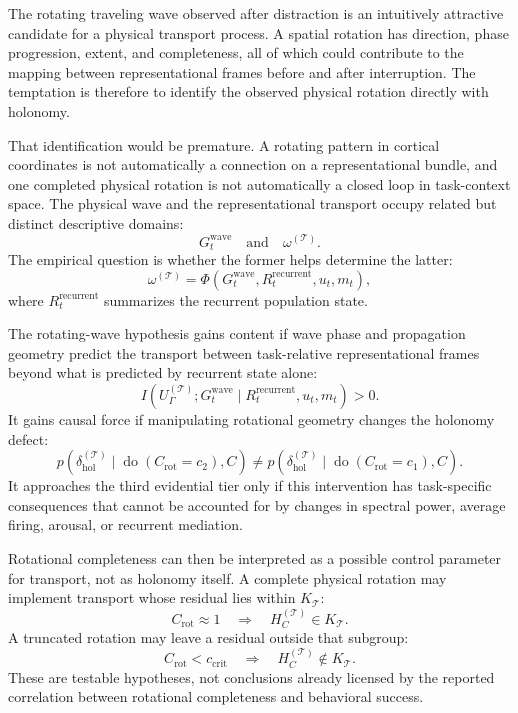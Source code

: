 \documentclass[11pt]{book}
\begin{document}
The rotating traveling wave observed after distraction is an intuitively attractive candidate for a physical transport process. A spatial rotation has direction, phase progression, extent, and completeness, all of which could contribute to the mapping between representational frames before and after interruption. The temptation is therefore to identify the observed physical rotation directly with holonomy.

That identification would be premature. A rotating pattern in cortical coordinates is not automatically a connection on a representational bundle, and one completed physical rotation is not automatically a closed loop in task-context space. The physical wave and the representational transport occupy related but distinct descriptive domains:
\[
G_t^{\mathrm{wave}}
\quad\text{and}\quad
\omega^{(\mathcal T)}.
\]
The empirical question is whether the former helps determine the latter:
\[
\omega^{(\mathcal T)}
=
\Phi\!\left(
G_t^{\mathrm{wave}},
R_t^{\mathrm{recurrent}},
u_t,
m_t
\right),
\]
where $R_t^{\mathrm{recurrent}}$ summarizes the recurrent population state.

The rotating-wave hypothesis gains content if wave phase and propagation geometry predict the transport between task-relative representational frames beyond what is predicted by recurrent state alone:
\[
I\!\left(
U_{\Gamma}^{(\mathcal T)};
G_t^{\mathrm{wave}}
\mid
R_t^{\mathrm{recurrent}},u_t,m_t
\right)>0.
\]
It gains causal force if manipulating rotational geometry changes the holonomy defect:
\[
p\!\left(
\delta_{\mathrm{hol}}^{(\mathcal T)}
\mid
\operatorname{do}(C_{\mathrm{rot}}=c_2),C
\right)
\neq
p\!\left(
\delta_{\mathrm{hol}}^{(\mathcal T)}
\mid
\operatorname{do}(C_{\mathrm{rot}}=c_1),C
\right).
\]
It approaches the third evidential tier only if this intervention has task-specific consequences that cannot be accounted for by changes in spectral power, average firing, arousal, or recurrent mediation.

Rotational completeness can then be interpreted as a possible control parameter for transport, not as holonomy itself. A complete physical rotation may implement transport whose residual lies within $K_{\mathcal T}$:
\[
C_{\mathrm{rot}}\approx 1
\quad\Rightarrow\quad
H_C^{(\mathcal T)}\in K_{\mathcal T}.
\]
A truncated rotation may leave a residual outside that subgroup:
\[
C_{\mathrm{rot}}<c_{\mathrm{crit}}
\quad\Rightarrow\quad
H_C^{(\mathcal T)}\notin K_{\mathcal T}.
\]
These are testable hypotheses, not conclusions already licensed by the reported correlation between rotational completeness and behavioral success.
\end{document}
